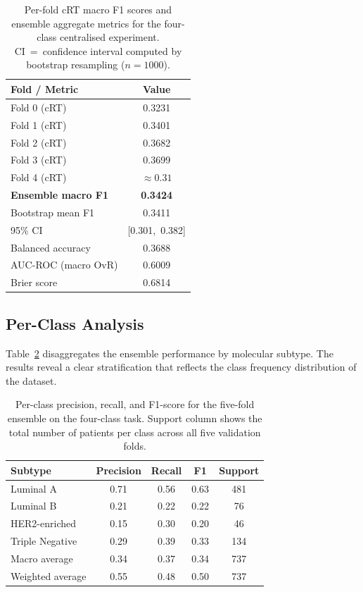 \begin{table}[htbp]
  \centering
  \caption{Per-fold cRT macro F1 scores and ensemble
    aggregate metrics for the four-class centralised
    experiment. CI~=~confidence interval computed by
    bootstrap resampling ($n=1000$).}
  \label{tab:fold-results}
  \renewcommand{\arraystretch}{1.3}
  \begin{tabular}{lc}
    \toprule
    \textbf{Fold / Metric} & \textbf{Value} \\
    \midrule
    Fold 0 (cRT) & 0.3231 \\
    Fold 1 (cRT) & 0.3401 \\
    Fold 2 (cRT) & 0.3682 \\
    Fold 3 (cRT) & 0.3699 \\
    Fold 4 (cRT) & $\approx 0.31$ \\
    \midrule
    \textbf{Ensemble macro F1} & \textbf{0.3424} \\
    Bootstrap mean F1          & 0.3411 \\
    95\% CI                    & [0.301,\ 0.382] \\
    Balanced accuracy          & 0.3688 \\
    AUC-ROC (macro OvR)        & 0.6009 \\
    Brier score                & 0.6814 \\
    \bottomrule
  \end{tabular}
\end{table}

\subsection{Per-Class Analysis}
\label{sec:perclass-results}

Table~\ref{tab:perclass-results} disaggregates the ensemble
performance by molecular subtype.
The results reveal a clear stratification that reflects the
class frequency distribution of the dataset.

\begin{table}[htbp]
  \centering
  \caption{Per-class precision, recall, and F1-score for the
    five-fold ensemble on the four-class task.
    Support column shows the total number of patients per
    class across all five validation folds.}
  \label{tab:perclass-results}
  \renewcommand{\arraystretch}{1.3}
  \begin{tabular}{lcccc}
    \toprule
    \textbf{Subtype} & \textbf{Precision}
      & \textbf{Recall} & \textbf{F1} & \textbf{Support} \\
    \midrule
    Luminal A       & 0.71 & 0.56 & 0.63 & 481 \\
    Luminal B       & 0.21 & 0.22 & 0.22 &  76 \\
    HER2-enriched   & 0.15 & 0.30 & 0.20 &  46 \\
    Triple Negative & 0.29 & 0.39 & 0.33 & 134 \\
    \midrule
    Macro average   & 0.34 & 0.37 & 0.34 & 737 \\
    Weighted average& 0.55 & 0.48 & 0.50 & 737 \\
    \bottomrule
  \end{tabular}
\end{table}

